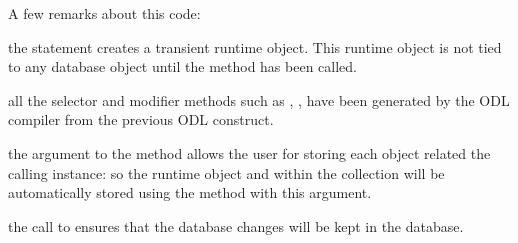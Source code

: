 A few remarks about this code:
\be
\item the statement  creates a
transient runtime object. This runtime object is not tied to any
database object until the  method has been called.
\item all the selector and modifier methods such as ,
,  have been generated by the \eyedb
ODL compiler from the previous ODL construct.
\item the  argument to the 
method allows the user for storing each object related the calling instance:
so the runtime object  and  within the 
collection will be automatically stored using the  method
with this argument.
\item the call to  ensures that the database changes
will be kept in the database.
\ee
